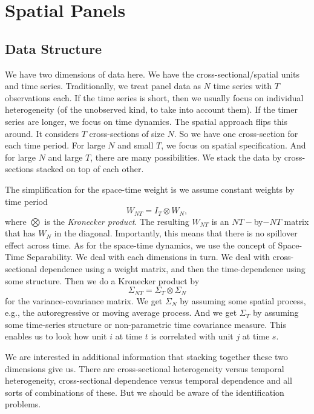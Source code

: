 \documentclass[11pt,a4paper]{amsart}
\theoremstyle{plain}
\theoremstyle{definition}
\begin{document}
\section{Spatial Panels}\hfill\par 
\subsection{Data Structure}\hfill\par 
We have two dimensions of data here. We have the cross-sectional/spatial units and time series. Traditionally, we treat panel data as $N$ time series with $T$ observations each. If the time series is short, then we usually focus on individual heterogeneity (of the unobserved kind, to take into account them). If the timer series are longer,  we focus on time dynamics. The spatial approach flips this around. It considers $T$ cross-sections of size $N$. So we have one cross-section for each time period. For large $N$ and small $T$, we focus on spatial specification. And for large $N$ and large $T$, there are many possibilities. We stack the data by cross-sections stacked on top of each other. 

The simplification for the space-time weight is we assume constant weights by time period
\[	W_{NT} = I_{T} \otimes W_{N},	\]
where $\bigotimes$ is the \textit{Kronecker product}. The resulting $W_{NT}$ is an $NT-$by$-NT$ matrix that has $W_{N}$ in the diagonal. Importantly, this means that there is no spillover effect across time. As for the space-time dynamics,  we use the concept of Space-Time Separability. We deal with each dimensions in turn. We deal with cross-sectional dependence using a weight matrix, and then the time-dependence using some structure. Then we do a Kronecker product by 
\[	\Sigma_{NT} = \Sigma_{T} \otimes \Sigma_{N}	\]
for the variance-covariance matrix. We get $ \Sigma_{N}$ by assuming some spatial  process, e.g., the autoregressive or moving average process. And we get $\Sigma_{T}$ by assuming some time-series structure or non-parametric time covariance measure. This enables us to look how unit $i$ at time $t$ is correlated with unit $j$ at time $s$. 

We are interested in additional information that stacking together these two dimensions give us. There are cross-sectional heterogeneity versus temporal heterogeneity, cross-sectional dependence versus temporal dependence and all sorts of combinations of these. But we should be aware of the identification problems. 
\end{document}
